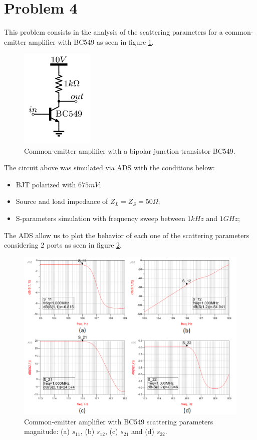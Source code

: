 \section{Problem 4}

This problem consists in the analysis of the scattering parameters for a common-emitter amplifier with BC549 as seen in figure \ref{p3:bc549}.

\begin{figure}[H] 
\centering
\includegraphics[width=3.5cm]{images/bc549.png}
\caption{Common-emitter amplifier with a bipolar junction transistor BC549.}
\label{p3:bc549} 
\end{figure}

The circuit above was simulated via ADS with the conditions below:

\begin{itemize}
    \item BJT polarized with $675 mV$;
    \item Source and load impedance of $Z_L = Z_S = 50 \Omega$;
    \item S-parameters simulation with frequency sweep between $1 kHz$ and $1 GHz$;
\end{itemize}

The ADS allow us to plot the behavior of each one of the scattering parameters considering 2 ports as seen in figure \ref{p4:sparams}.

\begin{figure}[H] 
\centering
\includegraphics[width=15cm]{images/sparams.png}
\caption{Common-emitter amplifier with BC549 scattering parameters magnitude: (a) $s_{11}$, (b) $s_{12}$, (c) $s_{21}$ and (d) $s_{22}$.}
\label{p4:sparams} 
\end{figure}

